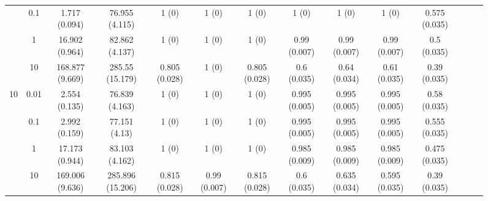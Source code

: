\documentclass[11pt]{article}
\theoremstyle{definition}
\begin{document}
\begin{sidewaysfigure}
\begin{tabular}{cc|cc|ccc|ccc|ccc|c}
    & 0.1 & 1.717 (0.094) & 76.955 (4.115) & 1 (0) & 1 (0) & 1 (0) & 1 (0) & 1 (0) & 1 (0) & 0.575 (0.035) \\ 
    & 1 & 16.902 (0.964) & 82.862 (4.137) & 1 (0) & 1 (0) & 1 (0) & 0.99 (0.007) & 0.99 (0.007) & 0.99 (0.007) & 0.5 (0.035) \\ 
   & 10 & 168.877 (9.669) & 285.55 (15.179) & 0.805 (0.028) & 1 (0) & 0.805 (0.028) & 0.6 (0.035) & 0.64 (0.034) & 0.61 (0.035) & 0.39 (0.035)\\[.3cm]  
    \multirow{4}{*}{10} & 0.01 & 2.554 (0.135) & 76.839 (4.163) & 1 (0) & 1 (0) & 1 (0) & 0.995 (0.005) & 0.995 (0.005) & 0.995 (0.005) & 0.58 (0.035) \\ 
    & 0.1 & 2.992 (0.159) & 77.151 (4.13) & 1 (0) & 1 (0) & 1 (0) & 0.995 (0.005) & 0.995 (0.005) & 0.995 (0.005) & 0.555 (0.035) \\ 
    & 1 & 17.173 (0.944) & 83.103 (4.162) & 1 (0) & 1 (0) & 1 (0) & 0.985 (0.009) & 0.985 (0.009) & 0.985 (0.009) & 0.475 (0.035) \\ 
    & 10 & 169.006 (9.636) & 285.896 (15.206) & 0.815 (0.028) & 0.99 (0.007) & 0.815 (0.028) & 0.6 (0.035) & 0.635 (0.034) & 0.595 (0.035) & 0.39 (0.035) \\
\end{tabular}
\end{sidewaysfigure}
\end{document}
